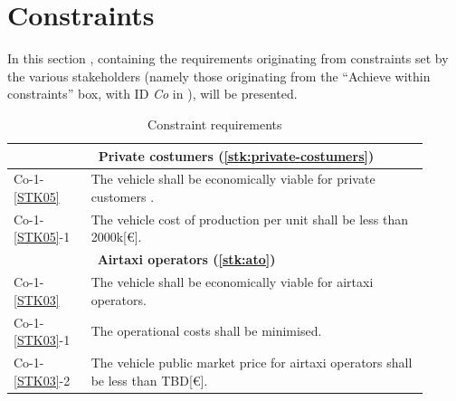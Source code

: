 \section{Constraints}
\label{sec:constraints}
In this section , containing the requirements originating from constraints set by the various stakeholders (namely those originating from the \enquote{Achieve within constraints} box, with ID \textit{Co} in ), will be presented.
    \begin{longtable}{m{0.17\linewidth}m{0.74\linewidth}}
    \caption{Constraint requirements}
    \label{tab:constrreqfinal}
        \\\hline &~\textbf{Private costumers (\ref{stk:private-costumers})} \\ \hline
        Co-1-\ref{STK05} & The vehicle shall be economically viable for private customers . \\
        \cellcolor[HTML]{9AFF99}Co-1-\ref{STK05}-1 & \cellcolor[HTML]{9AFF99}The vehicle cost of production per unit shall be less than 2000k[€]. \\

        \hline &~\textbf{Airtaxi operators (\ref{stk:ato})} \\\hline
         Co-1-\ref{STK03} & The vehicle shall be economically viable for airtaxi operators. \\
                        Co-1-\ref{STK03}-1 & The operational costs shall be minimised. \\
            Co-1-\ref{STK03}-2 & The vehicle public market price for airtaxi operators shall be less than TBD[€]. \\


\end{longtable}
